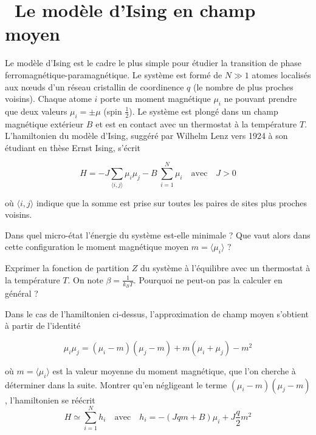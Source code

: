 \documentclass[utf8, 11pt]{feuille}
\begin{document}




\section{\medium~Le modèle d'Ising en champ moyen}

Le modèle d'Ising est le cadre le plus simple pour étudier la transition de phase ferromagnétique-paramagnétique. Le système est formé de $N \gg 1$ atomes localisés aux n\oe uds d'un réseau cristallin de coordinence $q$ (le nombre de plus proches voisins). Chaque atome $i$ porte un moment magnétique $\mu_i$ ne pouvant prendre que deux valeurs $\mu_i= \pm \mu$ (spin $\frac{1}{2}$). Le système est plongé dans un champ magnétique extérieur $B$ et est en contact avec un thermostat à la température $T$. L'hamiltonien du modèle d'Ising, suggéré par Wilhelm Lenz vers 1924 à son étudiant en thèse Ernst Ising, s'écrit

\begin{equation}
H=-J\sum_{\langle i,j \rangle}\mu_i \mu_j -B\ \sum_{i=1}^N \mu_i \quad \textrm{avec} \quad J>0
\end{equation}

où ${\langle i,j\rangle}$ indique que la somme est prise sur toutes les paires de sites plus proches voisins.

\medskip

\question
Dans quel micro-état l'énergie du système est-elle minimale ? Que vaut alors dans cette configuration le moment magnétique moyen $m=\langle \mu_i \rangle$ ?

\question
Exprimer la fonction de partition $Z$ du système à l'équilibre avec un thermostat à la température $T$. On note $\beta=\frac{1}{k_B T}$. Pourquoi ne peut-on pas la calculer en général ?

\question
Dans le cas de l'hamiltonien ci-dessus, l'approximation de champ moyen s'obtient à partir de l'identité

\begin{equation}
\mu_i\mu_j = (\mu_i -m)(\mu_j -m)+ m(\mu_i+\mu_j)-m^2
\end{equation}

où $m=\langle \mu_i \rangle$ est la valeur moyenne du moment magnétique, que l'on cherche à déterminer dans la suite.  Montrer qu'en négligeant le terme $(\mu_i -m)(\mu_j -m)$, l'hamiltonien se réécrit 
$$
H \simeq \sum_{i=1}^N h_i \quad \textrm{avec} \quad h_i= -(Jqm+B) \mu_i
+J\frac{q}{2} m^2
$$
\end{document}
